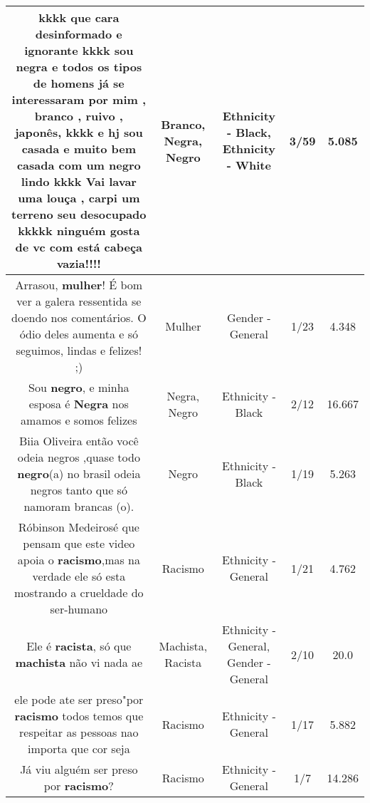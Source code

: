 \documentclass[11pt]{article}
\newlength\mylength
\begin{document}
\begin{center}
\begin{longtable}{|C{.65\mylength}|C{.30\mylength}|C{.12\mylength}|C{.12\mylength}|C{.12\mylength}|}
  \small kkkk que cara desinformado   e ignorante kkkk sou \textbf{negra} e todos os tipos de homens já se interessaram por mim , \textbf{branco} , ruivo , japonês, kkkk e hj sou casada e muito bem casada com um \textbf{negro} lindo kkkk Vai lavar uma louça , carpi um terreno seu desocupado kkkkk ninguém gosta de vc com está cabeça vazia!!!!\normalsize   & Branco, Negra, Negro & Ethnicity - Black, Ethnicity - White & 3/59 & 5.085 \\  \hline
  \small Arrasou, \textbf{mulher}! É bom ver a galera ressentida se doendo nos comentários. O ódio deles aumenta e só seguimos, lindas e felizes! ;)\normalsize   & Mulher & Gender - General & 1/23 & 4.348 \\  \hline
  \small Sou \textbf{negro}, e minha esposa é \textbf{Negra} nos amamos e somos felizes\normalsize   & Negra, Negro & Ethnicity - Black & 2/12 & 16.667 \\  \hline
  \small Biia Oliveira então você odeia negros ,quase todo \textbf{negro}(a) no brasil odeia negros tanto que só namoram brancas (o).\normalsize   & Negro & Ethnicity - Black & 1/19 & 5.263 \\  \hline
  \small Róbinson Medeirosé que pensam que este video apoia o \textbf{racismo},mas na verdade ele só esta mostrando a crueldade do ser-humano\normalsize   & Racismo & Ethnicity - General & 1/21 & 4.762 \\  \hline
  \small Ele é \textbf{racista}, só que \textbf{machista} não vi nada ae\normalsize   & Machista, Racista & Ethnicity - General, Gender - General & 2/10 & 20.0 \\  \hline
  \small ele pode ate ser preso"por \textbf{racismo} todos temos que respeitar as pessoas nao importa que cor seja\normalsize   & Racismo & Ethnicity - General & 1/17 & 5.882 \\  \hline
  \small Já viu alguém ser preso por \textbf{racismo}?\normalsize   & Racismo & Ethnicity - General & 1/7 & 14.286 \\  \hline

\end{longtable}
\end{center}
\end{document}
